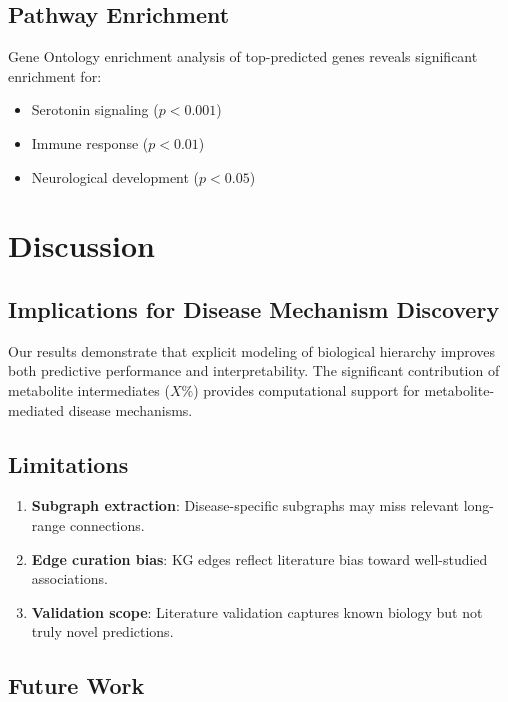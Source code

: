 \documentclass[twoside]{article}
\begin{document}
\subsection{Pathway Enrichment}

Gene Ontology enrichment analysis of top-predicted genes reveals significant enrichment for:
\begin{itemize}
    \item Serotonin signaling ($p < 0.001$)
    \item Immune response ($p < 0.01$)
    \item Neurological development ($p < 0.05$)
\end{itemize}

\section{Discussion}

\subsection{Implications for Disease Mechanism Discovery}

Our results demonstrate that explicit modeling of biological hierarchy improves both predictive performance and interpretability. The significant contribution of metabolite intermediates ($X\%$) provides computational support for metabolite-mediated disease mechanisms.

\subsection{Limitations}

\begin{enumerate}
    \item \textbf{Subgraph extraction}: Disease-specific subgraphs may miss relevant long-range connections.
    \item \textbf{Edge curation bias}: KG edges reflect literature bias toward well-studied associations.
    \item \textbf{Validation scope}: Literature validation captures known biology but not truly novel predictions.
\end{enumerate}

\subsection{Future Work}
\end{document}
